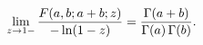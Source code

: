 \[\lim_{z\to 1-}\frac{\mathop{F\/}\nolimits\!\left(a,b;a+b;z\right)}{-\mathop{%
\ln\/}\nolimits\!\left(1-z\right)}=\frac{\mathop{\Gamma\/}\nolimits\!\left(a+b%
\right)}{\mathop{\Gamma\/}\nolimits\!\left(a\right)\mathop{\Gamma\/}\nolimits%
\!\left(b\right)}.\]